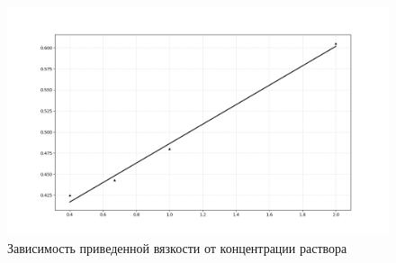 \documentclass[12pt]{article}
\begin{document}
\begin{figure}
	\includegraphics[width = \linewidth]{../linear.png}
	\caption{Зависимость приведенной вязкости от концентрации раствора}
\end{figure}
\end{document}
